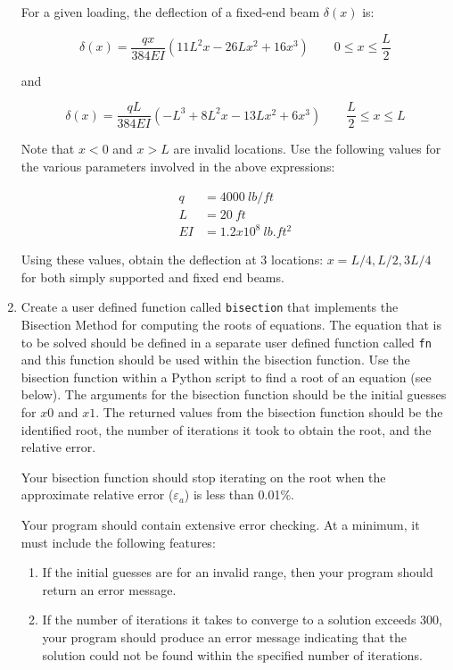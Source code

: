 \documentclass[a4paper,12pt]{article}
\begin{document}
\begin{enumerate}
	For a given loading, the deflection of a fixed-end beam $\delta(x)$ is:
	
	\begin{equation*}
	\delta(x) = \frac{q x}{384EI}(11L^2x - 26Lx^2 + 16x^3) \qquad 0 \le x \le \frac{L}{2}
	\end{equation*}
	
	and 
	
	\begin{equation*}
	\delta(x) = \frac{q L}{384EI}( -L^3  + 8L^2x - 13Lx^2 + 6x^3) \qquad \frac{L}{2} \le x \le L
	\end{equation*}
	
	Note that $x < 0$ and $x > L$ are invalid locations. Use the following values for the various parameters involved in the above expressions:
	
	\begin{align*}
		q & = 4000 ~lb/ft\\
		L & = 20 ~ft\\
		EI & = 1.2x10^8 ~lb.ft^2
	\end{align*}
	
	Using these values, obtain the deflection at 3 locations: $x = L/4, L/2, 3L/4$ for both simply supported and fixed end beams.
	
	\item Create a user defined function called \verb|bisection| that implements the Bisection Method for computing the roots of equations. The equation that is to be solved should be defined in a separate user defined function called \verb|fn| and this function should be used within the bisection function. Use the bisection function within a Python script to find a root of an equation (see below).
	The arguments for the bisection function should be the initial guesses for $x0$ and $x1$.  The returned values from the bisection function should be the identified root, the number of iterations it took to obtain the root, and the relative error. 
	
	Your bisection function should stop iterating on the root when the approximate relative error ($\varepsilon_a$) is less than 0.01\%.

	Your program should contain extensive error checking. At a minimum, it must include the following features:
	\begin{enumerate}
		\item If the initial guesses are for an invalid range, then your program should return an error message.
		\item If the number of iterations it takes to converge to a solution exceeds 300, your program should produce an error message indicating that the solution could not be found within the specified number of iterations.
	\end{enumerate}


\end{enumerate}
\end{document}
